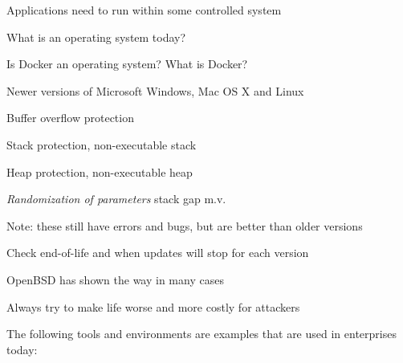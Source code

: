 \documentclass[Screen16to9,17pt]{foils}
\begin{document}

\begin{list2}
\item Applications need to run within some controlled system
\item What is an operating system today?
\item Is Docker an operating system? What is Docker?
\end{list2}




\begin{list1}
\item Newer versions of Microsoft Windows, Mac OS X and Linux
\begin{list2}
\item Buffer overflow protection
\item Stack protection, non-executable stack
\item Heap protection, non-executable heap
\item \emph{Randomization of parameters} stack gap m.v.
\end{list2}
\item Note: these still have errors and bugs, but are better than older versions
\item Check end-of-life and when updates will stop for each version
\item OpenBSD has shown the way in many cases\\ 
\end{list1}

\vskip 1cm

\centerline{Always try to make life worse and more costly for attackers}






The following tools and environments are examples that are used in enterprises today:
\end{document}
